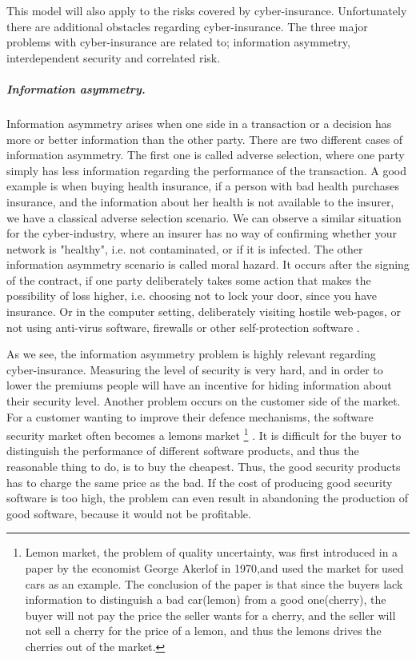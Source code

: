 This model will also apply to the risks covered by cyber-insurance. Unfortunately there are additional obstacles regarding cyber-insurance. The three major problems with cyber-insurance are related to; information asymmetry, interdependent security and correlated risk. 
 
\subparagraph{Information asymmetry.}
Information asymmetry arises when one side in a transaction or a decision has more or better information than the other party. There are two different cases of information asymmetry. The first one is called adverse selection, where one party simply has less information regarding the performance of the transaction. A good example is when buying health insurance, if a person with bad health purchases insurance, and the information about her health is not available to the insurer, we have a classical adverse selection scenario. We can observe a similar situation for the cyber-industry, where an insurer has no way of confirming whether your network is "healthy", i.e. not contaminated, or if it is infected. 
The other information asymmetry scenario is called moral hazard. It occurs after the signing of the contract, if one party deliberately takes some action that makes the possibility of loss higher, i.e. choosing not to lock your door, since you have insurance. Or in the computer setting, deliberately visiting hostile web-pages, or not using anti-virus software, firewalls or other self-protection software \cite{solutiontoinfoasym}.
    
    
As we see, the information asymmetry problem is highly relevant regarding cyber-insurance. Measuring the level of security is very hard, and in order to lower the premiums people will have an incentive for hiding information about their security level. Another problem occurs on the customer side of the market. For a customer wanting to improve their defence mechanisms, the software security market often becomes a lemons market 
\footnote{Lemon market, the problem of quality uncertainty, was first introduced in a paper \cite{lemonpaper} by the economist George Akerlof in 1970,and used the market for used cars as an example.\cite{lemon} The conclusion of the paper is that since the buyers lack information to distinguish a bad car(lemon) from a good one(cherry), the buyer will not pay the price the seller wants for a cherry, and the seller will not sell a cherry for the price of a lemon, and thus the lemons drives the cherries out of the market.}
. 
It is difficult for the buyer to distinguish the performance of different software products, and thus the reasonable thing to do, is to buy the cheapest. Thus, the good security products has to charge the same price as the bad. If the cost of producing good security software is too high, the problem can even result in abandoning the production of good software, because it would not be profitable.


